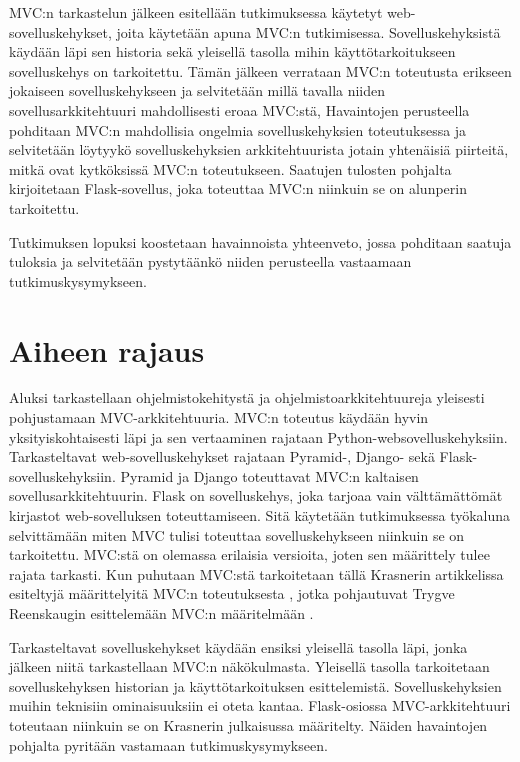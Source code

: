\documentclass[utf8]{gradu3}
\begin{document}
MVC:n tarkastelun jälkeen esitellään tutkimuksessa käytetyt web-sovelluskehykset, 
joita käytetään apuna MVC:n tutkimisessa. Sovelluskehyksistä käydään läpi sen 
historia sekä yleisellä tasolla mihin käyttötarkoitukseen
sovelluskehys on tarkoitettu. Tämän jälkeen verrataan MVC:n toteutusta erikseen 
jokaiseen sovelluskehykseen ja selvitetään millä tavalla niiden sovellusarkkitehtuuri 
mahdollisesti eroaa MVC:stä,
Havaintojen perusteella pohditaan MVC:n mahdollisia ongelmia sovelluskehyksien toteutuksessa 
ja selvitetään löytyykö sovelluskehyksien arkkitehtuurista jotain yhtenäisiä piirteitä, mitkä ovat
kytköksissä MVC:n toteutukseen. Saatujen tulosten pohjalta  kirjoitetaan Flask-sovellus, joka toteuttaa MVC:n 
niinkuin se on alunperin tarkoitettu.

Tutkimuksen lopuksi koostetaan havainnoista yhteenveto, jossa pohditaan saatuja tuloksia ja selvitetään 
pystytäänkö niiden perusteella vastaamaan tutkimuskysymykseen.


\chapter{Aiheen rajaus}
Aluksi tarkastellaan ohjelmistokehitystä ja ohjelmistoarkkitehtuureja yleisesti pohjustamaan MVC-arkkitehtuuria. MVC:n toteutus käydään
hyvin yksityiskohtaisesti läpi ja sen vertaaminen rajataan Python-websovelluskehyksiin. Tarkasteltavat web-sovelluskehykset rajataan 
Pyramid-, Django- sekä Flask-sovelluskehyksiin. Pyramid ja Django toteuttavat MVC:n kaltaisen
sovellusarkkitehtuurin. Flask on sovelluskehys, joka tarjoaa vain
välttämättömät kirjastot web-sovelluksen toteuttamiseen. Sitä
käytetään tutkimuksessa työkaluna selvittämään miten MVC tulisi
toteuttaa sovelluskehykseen niinkuin se on tarkoitettu. MVC:stä on olemassa erilaisia versioita, joten sen määrittely tulee rajata tarkasti.
Kun puhutaan MVC:stä tarkoitetaan tällä Krasnerin
artikkelissa esiteltyjä määrittelyitä MVC:n
toteutuksesta \parencite{krasner}, jotka pohjautuvat Trygve Reenskaugin esittelemään 
MVC:n määritelmään \parencite{xerox-original}. 

Tarkasteltavat sovelluskehykset käydään ensiksi yleisellä tasolla läpi, jonka jälkeen niitä tarkastellaan MVC:n näkökulmasta. Yleisellä tasolla tarkoitetaan sovelluskehyksen historian ja käyttötarkoituksen esittelemistä. Sovelluskehyksien muihin teknisiin ominaisuuksiin ei oteta kantaa. Flask-osiossa MVC-arkkitehtuuri toteutaan niinkuin se on Krasnerin julkaisussa määritelty. Näiden havaintojen pohjalta pyritään vastamaan tutkimuskysymykseen.
\end{document}
